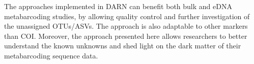    The approaches implemented in DARN can benefit both bulk and eDNA metabarcoding studies, by allowing quality control and further investigation of the unassigned OTUs/ASVs. 
   The approach is also adaptable to other markers than COI. Moreover, the approach presented here allows researchers to better understand the known unknowns and shed light on the dark matter of their metabarcoding sequence data.






